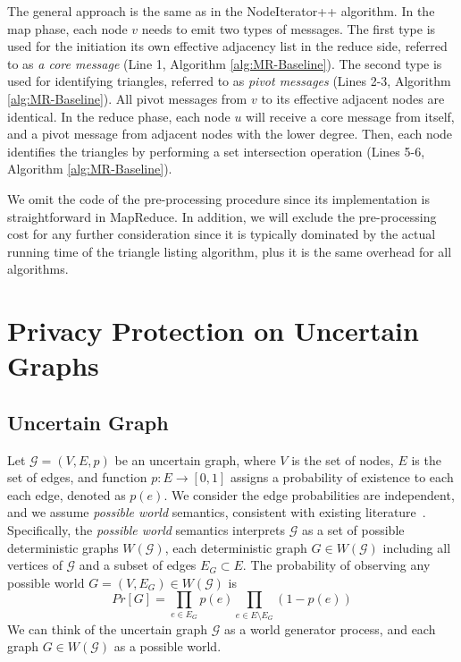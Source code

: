 The general approach is the same as in the NodeIterator++ algorithm. In the map phase, each node $v$ needs to emit two types of messages. The first type is used for the initiation its own effective adjacency list in the reduce side, 
referred to as {\em a core message} (Line 1, Algorithm \ref{alg:MR-Baseline}). 
The second type is used for identifying triangles, referred to as {\em pivot messages} (Lines 2-3, Algorithm \ref{alg:MR-Baseline}). 
All pivot messages from $v$ to its effective adjacent nodes are identical. In the reduce phase, each node $u$ will receive a core message from itself, and a pivot message from adjacent nodes with the lower degree. Then, each node identifies the triangles by performing a set intersection operation (Lines 5-6, Algorithm \ref{alg:MR-Baseline}). 

We omit the code of the pre-processing procedure since its implementation is straightforward in MapReduce. In addition, we will exclude the pre-processing cost for any further consideration since it is typically dominated by the actual running time of the triangle listing algorithm, plus it is the same overhead for all algorithms. 

\section{Privacy Protection on Uncertain Graphs}
\subsection{Uncertain Graph}
Let  $\mathcal{G}=(V,E,\mathit{p})$ be an uncertain graph, where $V$ is the set of nodes, $E$ is the set of edges, and function $\mathit{p}: E \rightarrow [0,1]$ assigns a  probability of existence to each each edge, denoted as $\mathit{p}(e)$. We consider the edge probabilities are independent, and we assume \emph{possible world} semantics, consistent with existing literature~\cite{Potamias_K_2010,Adar_Managing_2007,Kempe_Maximizing_2003}. Specifically, the \emph{possible world} semantics interprets $\mathcal{G}$ as a set of possible deterministic graphs $W(\mathcal{G})$, each deterministic graph $G \in W(\mathcal{G})$ including all vertices of $\mathcal{G}$ and a subset of edges $E_{G} \subset E$.  The probability of observing any possible world $G=(V,E_{G}) \in W(\mathcal{G})$ is 
\begin{equation*}
    Pr[G]=\prod_{e \in E_{G}} {\mathit{p}(e)} \prod_{e \in E     \setminus E_{G}} (1-\mathit{p}(e))
\end{equation*}
We can think of the uncertain graph $\mathcal{G}$ as a world generator process, and each graph $G\in W(\mathcal{G})$ as a possible world. 

